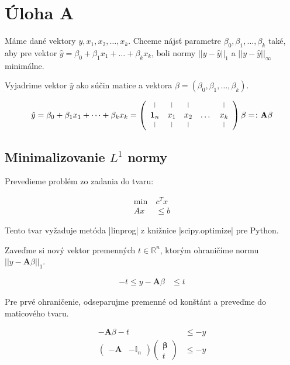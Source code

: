 \documentclass[12pt,oneside,a4paper,slovak]{article}
\newcommand*{\vertbar}{\rule[0ex]{0.3pt}{1.5ex}}
\begin{document}
   

\section*{Úloha A}

Máme dané vektory $y, x_1, x_2, \dots, x_k$. Chceme nájsť parametre $\beta_0, \beta_1,\dots,\beta_k$ také, aby pre vektor $\hat{y} = \beta_0 + \beta_1x_1 + \dots + \beta_kx_k$, boli normy $||y - \hat{y}||_1$ a $||y - \hat{y}||_{\infty}$ minimálne. 

Vyjadrime vektor $\hat{y}$ ako súčin matice a vektora $\beta = (\beta_0, \beta_1, \dots, \beta_k)$.

\begin{align*}
	\hat{y} = \beta_0 + \beta_1x_1 + \dots + \beta_kx_k = 
	\left(
		\begin{array}{ccccc}
			\vertbar & \vertbar & \vertbar &  & \vertbar \\
			\mathbf{1}_n & x_1 & x_2 & \dots & x_k \\
			\vertbar & \vertbar & \vertbar &  & \vertbar
		\end{array}
	\right)
	\beta
	=\colon
	\mathbf{A} \beta
\end{align*}

\subsection*{Minimalizovanie $L^1$ normy}

Prevedieme problém zo zadania do tvaru:

\begin{align*}
	\text{min}~ &c^Tx\\
	Ax &\leq b
\end{align*}

Tento tvar vyžaduje metóda \pyth|linprog| z knižnice \pyth|scipy.optimize| pre Python.

Zaveďme si nový vektor premenných $t \in \mathbb{R}^n$, ktorým ohraničíme normu $||y - \mathbf{A} \beta||_1$.

\begin{align*}
	-t \leq y - \mathbf{A} \beta &\leq t
\end{align*}	

Pre prvé ohraničenie, odseparujme premenné od konštánt a preveďme do maticového tvaru.

\begin{align*}
	- \mathbf{A} \beta - t &\leq -y \\
	\left(
		\begin{array}{c|c}
			-\mathbf{A} & -\mathbb{I}_n
		\end{array}
	\right)
	\left(
		\begin{array}{c}
			\boldsymbol{\beta} \\
			\hline
			t
		\end{array}
	\right) &\leq -y
\end{align*}
\end{document}
